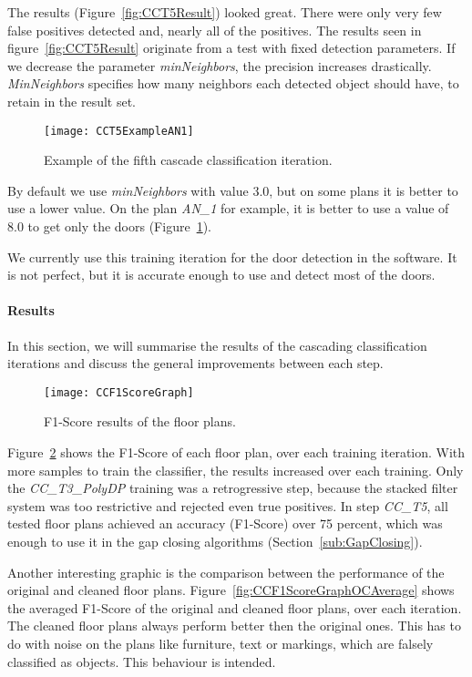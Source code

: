 The results (Figure~\ref{fig:CCT5Result}) looked great. There were only very few false positives detected and, nearly all of the positives. The results seen in figure~\ref{fig:CCT5Result} originate from a test with fixed detection parameters. If we decrease the parameter \textit{minNeighbors}, the precision increases drastically. \textit{MinNeighbors} specifies how many neighbors each detected object should have, to retain in the result set.

\begin{figure}[H]
	\centering
	\texttt{[image: CCT5ExampleAN1]}
	\caption{Example of the fifth cascade classification iteration.}
	\label{fig:CCT5ExampleAN1}
\end{figure}

By default we use \textit{minNeighbors} with value $3.0$, but on some plans it is better to use a lower value. On the plan \textit{AN\_1} for example, it is better to use a value of 8.0 to get only the doors (Figure~\ref{fig:CCT5ExampleAN1}).

We currently use this training iteration for the door detection in the software. It is not perfect, but it is accurate enough to use and detect most of the doors.

\paragraph{Results}
\label{sec:ResultsCascade}
In this section, we will summarise the results of the cascading classification iterations and discuss the general improvements between each step.

\begin{figure}[H]
	\centering
	\texttt{[image: CCF1ScoreGraph]}
	\caption{F1-Score results of the floor plans.}
	\label{fig:CCF1ScoreGraph}
\end{figure}

Figure~\ref{fig:CCF1ScoreGraph} shows the F1-Score of each floor plan, over each training iteration. With more samples to train the classifier, the results increased over each training. Only the \textit{CC\_T3\_PolyDP} training was a retrogressive step, because the stacked filter system was too restrictive and rejected even true positives. In step \textit{CC\_T5}, all tested floor plans achieved an accuracy (F1-Score) over 75 percent, which was enough to use it in the gap closing algorithms (Section~\ref{sub:GapClosing}).

Another interesting graphic is the comparison between the performance of the original and cleaned floor plans. Figure~\ref{fig:CCF1ScoreGraphOCAverage} shows the averaged F1-Score of the original and cleaned floor plans, over each iteration. The cleaned floor plans always perform better then the original ones. This has to do with noise on the plans like furniture, text or markings, which are falsely classified as objects. This behaviour is intended.

